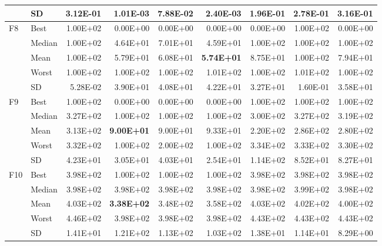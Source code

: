 \documentclass[algorithms,article,submit,moreauthors,pdftex]{Definitions/mdpi}
\newcommand{\bestval}[1]{\textbf{#1}}
\begin{document}
\begin{table}[p]
{\begin{tabular}{llrrrrrrr}
 & SD & 3.12E-01 & 1.01E-03 & 7.88E-02 & 2.40E-03 & 1.96E-01 & 2.78E-01 & 3.16E-01 \\
\midrule
F8 & Best & 1.00E+02 & 0.00E+00 & 0.00E+00 & 0.00E+00 & 0.00E+00 & 1.00E+02 & 0.00E+00 \\
 & Median & 1.00E+02 & 4.64E+01 & 7.01E+01 & 4.59E+01 & 1.00E+02 & 1.00E+02 & 1.00E+02 \\
 & Mean & 1.00E+02 & 5.79E+01 & 6.08E+01 & \bestval{5.74E+01} & 8.75E+01 & 1.00E+02 & 7.94E+01 \\
 & Worst & 1.00E+02 & 1.00E+02 & 1.00E+02 & 1.01E+02 & 1.00E+02 & 1.01E+02 & 1.00E+02 \\
 & SD & 5.28E-02 & 3.90E+01 & 4.08E+01 & 4.22E+01 & 3.27E+01 & 1.60E-01 & 3.58E+01 \\
\midrule
F9 & Best & 1.00E+02 & 0.00E+00 & 0.00E+00 & 0.00E+00 & 1.00E+02 & 1.00E+02 & 1.00E+02 \\
 & Median & 3.27E+02 & 1.00E+02 & 1.00E+02 & 1.00E+02 & 3.00E+02 & 3.27E+02 & 3.19E+02 \\
 & Mean & 3.13E+02 & \bestval{9.00E+01} & 9.00E+01 & 9.33E+01 & 2.20E+02 & 2.86E+02 & 2.80E+02 \\
 & Worst & 3.32E+02 & 1.00E+02 & 2.00E+02 & 1.00E+02 & 3.34E+02 & 3.33E+02 & 3.30E+02 \\
 & SD & 4.23E+01 & 3.05E+01 & 4.03E+01 & 2.54E+01 & 1.14E+02 & 8.52E+01 & 8.27E+01 \\
\midrule
F10 & Best & 3.98E+02 & 1.00E+02 & 1.00E+02 & 1.00E+02 & 3.98E+02 & 3.98E+02 & 3.98E+02 \\
 & Median & 3.98E+02 & 3.98E+02 & 3.98E+02 & 3.98E+02 & 3.98E+02 & 3.99E+02 & 3.98E+02 \\
 & Mean & 4.03E+02 & \bestval{3.38E+02} & 3.48E+02 & 3.58E+02 & 4.03E+02 & 4.02E+02 & 4.00E+02 \\
 & Worst & 4.46E+02 & 3.98E+02 & 3.98E+02 & 3.98E+02 & 4.43E+02 & 4.43E+02 & 4.43E+02 \\
 & SD & 1.41E+01 & 1.21E+02 & 1.13E+02 & 1.03E+02 & 1.38E+01 & 1.14E+01 & 8.29E+00 \\
\bottomrule
\end{tabular}}
\end{table}
\end{document}
